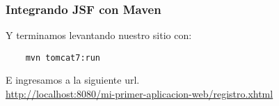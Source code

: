 \documentclass{beamer}
\begin{document}
\begin{frame}[fragile]
  \frametitle{Integrando JSF con Maven}
  Y terminamos levantando nuestro sitio con:

  \begin{verbatim}
    mvn tomcat7:run
  \end{verbatim}

  E ingresamos a la siguiente url.\\

  \url{http://localhost:8080/mi-primer-aplicacion-web/registro.xhtml}
\end{frame}
\end{document}
